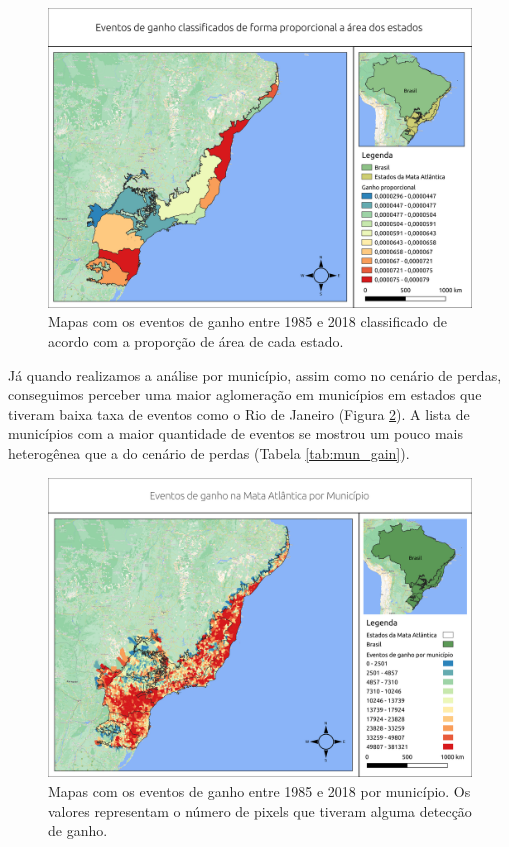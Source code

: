 \begin{figure}[H]
    \centering
    \includegraphics[scale=.5]{images/estado_gain_proporcional.png}
    \caption{Mapas com os eventos de ganho entre 1985 e 2018 classificado de acordo com a proporção de área de cada estado.}
    \label{fig:estados_gain_proporcional}
\end{figure}

Já quando realizamos a análise por município, assim como no cenário de perdas, conseguimos perceber uma maior aglomeração em municípios em estados que tiveram baixa taxa de eventos como o Rio de Janeiro (Figura \ref{fig:mun_gain}). A lista de municípios com a maior quantidade de eventos se mostrou um pouco mais heterogênea que a do cenário de perdas (Tabela \ref{tab:mun_gain}). 

\begin{figure}[H]
    \centering
    \includegraphics[scale=.5]{images/mun_gain_seg6_masked18_dur_gt4_inv_for.png}
    \caption{Mapas com os eventos de ganho entre 1985 e 2018 por município. Os valores representam o número de pixels que tiveram alguma detecção de ganho.}
    \label{fig:mun_gain}
\end{figure}

